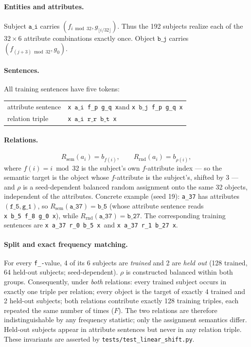 \documentclass[11pt]{article}
\newcommand{\sep}{\texttt{x}}
\newcommand{\subj}[1]{\texttt{a\_#1}}
\newcommand{\obj}[1]{\texttt{b\_#1}}
\newcommand{\rel}[1]{\texttt{r\_#1}}
\newcommand{\fatt}[1]{\texttt{f\_#1}}
\newcommand{\gatt}[1]{\texttt{g\_#1}}
\newcommand{\Rsem}{R_{\mathrm{sem}}}
\newcommand{\Rrnd}{R_{\mathrm{rnd}}}
\begin{document}
\paragraph{Entities and attributes.}
Subject $\subj{i}$ carries $(f_{i \bmod 32},g_{\lfloor i/32\rfloor})$. Thus the 192 subjects realize each of the $32 \times 6$ attribute combinations exactly once. Object $\obj{j}$ carries $(f_{(j+3) \bmod 32},g_0)$.

\paragraph{Sentences.}
All training sentences have five tokens:
\begin{center}
\begin{tabular}{ll}
attribute sentence & \sep\ $\subj{i}$\ \fatt{p}\ \gatt{q}\ \sep \quad and \quad \sep\ $\obj{j}$\ \fatt{p}\ \gatt{q}\ \sep\\
relation triple & \sep\ $\subj{i}$\ $\rel{r}$\ $\obj{t}$\ \sep
\end{tabular}
\end{center}

\paragraph{Relations.}
\[
\Rsem(a_i) = b_{f(i)}, \qquad \Rrnd(a_i) = b_{\rho(i)},
\]
where $f(i) = i \bmod 32$ is the subject's own $f$-attribute index --- so the semantic target is the object whose $f$-attribute is the subject's, shifted by 3 --- and $\rho$ is a seed-dependent balanced random assignment onto the same 32 objects, independent of the attributes.
Concrete example (seed 19): \subj{37} has attributes $(\fatt{5}, \gatt{1})$, so $\Rsem(\subj{37})=\obj{5}$ (whose attribute sentence reads \sep\ \obj{5}\ \fatt{8}\ \gatt{0}\ \sep), while $\Rrnd(\subj{37})=\obj{27}$. The corresponding training sentences are \sep\ \subj{37}\ \rel{0}\ \obj{5}\ \sep\ and \sep\ \subj{37}\ \rel{1}\ \obj{27}\ \sep.

\paragraph{Split and exact frequency matching.}
For every \fatt-value, 4 of its 6 subjects are \emph{trained} and 2 are \emph{held out} (128 trained, 64 held-out subjects; seed-dependent). $\rho$ is constructed balanced within both groups. Consequently, under \emph{both} relations: every trained subject occurs in exactly one triple per relation; every object is the target of exactly 4 trained and 2 held-out subjects; both relations contribute exactly 128 training triples, each repeated the same number of times ($F$). The two relations are therefore indistinguishable by any frequency statistic; only the assignment semantics differ. Held-out subjects appear in attribute sentences but never in any relation triple. These invariants are asserted by \texttt{tests/test\_linear\_shift.py}.
\end{document}
